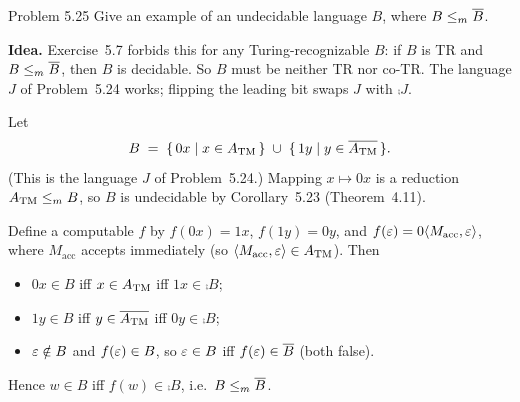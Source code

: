 \newcommand{\ACFG}{A_{\mathrm{CFG}}}
\newcommand{\ALLCFG}{\mathit{ALL}_{\mathrm{CFG}}}
\newcommand{\ELBA}{E_{\mathrm{LBA}}}

\begin{question}{Problem 5.25}
Give an example of an undecidable language $B$, where $B\le_{m}\overline{B}$.
\end{question}
\begin{soln}
\textbf{Idea.} Exercise~5.7 forbids this for any Turing-recognizable $B$: if $B$ is TR and $B\le_{m}\overline{B}$, then $B$ is decidable. So $B$ must be neither TR nor co-TR. The language $J$ of Problem~5.24 works; flipping the leading bit swaps $J$ with $\comp{J}$.

Let
\[
B \;=\; \{\,0x\mid x\in A_{\mathrm{TM}}\,\}\;\cup\;\{\,1y\mid y\in\overline{A_{\mathrm{TM}}}\,\}.
\]
(This is the language $J$ of Problem~5.24.) Mapping $x\mapsto 0x$ is a reduction $A_{\mathrm{TM}}\le_{m} B$, so $B$ is undecidable by Corollary~5.23 (Theorem~4.11).

Define a computable $f$ by $f(0x)=1x$, $f(1y)=0y$, and $f(\varepsilon)=0\langle M_{\mathrm{acc}},\varepsilon\rangle$, where $M_{\mathrm{acc}}$ accepts immediately (so $\langle M_{\mathrm{acc}},\varepsilon\rangle\in A_{\mathrm{TM}}$). Then
\begin{itemize}
\item $0x\in B$ iff $x\in A_{\mathrm{TM}}$ iff $1x\in\comp{B}$;
\item $1y\in B$ iff $y\in\overline{A_{\mathrm{TM}}}$ iff $0y\in\comp{B}$;
\item $\varepsilon\notin B$ and $f(\varepsilon)\in B$, so $\varepsilon\in B$ iff $f(\varepsilon)\in\overline{B}$ (both false).
\end{itemize}
Hence $w\in B$ iff $f(w)\in\comp{B}$, i.e.\ $B\le_{m}\overline{B}$.
\end{soln}

